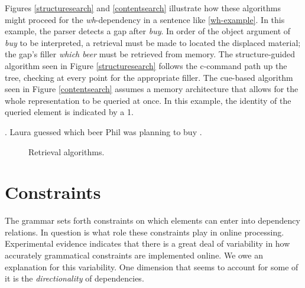 \documentclass[12pt,letterpaper]{article}
\newcommand{\gap}{\underline{\hspace{1em}} }
\newcommand{\wh}{\textit{wh}}
\begin{document}
Figures \ref{structuresearch} and \ref{contentsearch} illustrate how these algorithms might proceed for the \wh-dependency in a sentence like \ref{wh-example}. In this example, the parser detects a gap after \emph{buy}. In order of the object argument of \emph{buy} to be interpreted, a retrieval must be made to located the displaced material; the gap's filler \emph{which beer} must be retrieved from memory. The structure-guided algorithm seen in Figure \ref{structuresearch} follows the c-command path up the tree, checking at every point for the appropriate filler. The cue-based algorithm seen in Figure \ref{contentsearch} assumes a memory architecture that allows for the whole representation to be queried at once. In this example, the identity of the queried element is indicated by a 1.

\ex. Laura guessed which beer Phil was planning to buy \gap. \label{wh-example}

\begin{figure}[h!]
  \centering
  \caption{Retrieval algorithms.}
\end{figure}


\section{Constraints}

The grammar sets forth constraints on which elements can enter into dependency relations. In question is what role these constraints play in online processing. Experimental evidence indicates that there is a great deal of variability in how accurately grammatical constraints are implemented online. We owe an explanation for this variability. One dimension that seems to account for some of it is the \emph{directionality} of dependencies.
\end{document}
